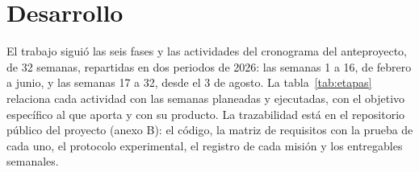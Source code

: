 \chapter{Desarrollo}
\label{cap:desarrollo}

El trabajo siguió las seis fases y las actividades del cronograma del anteproyecto, de 32 semanas, repartidas en dos periodos de 2026: las semanas 1 a 16, de febrero a junio, y las semanas 17 a 32, desde el 3 de agosto. La tabla~\ref{tab:etapas} relaciona cada actividad con las semanas planeadas y ejecutadas, con el objetivo específico al que aporta y con su producto. La trazabilidad está en el repositorio público del proyecto (anexo B): el código, la matriz de requisitos con la prueba de cada uno, el protocolo experimental, el registro de cada misión y los entregables semanales.

